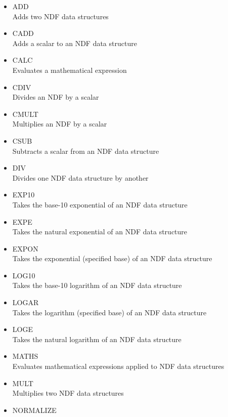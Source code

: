 \documentclass[twoside,11pt]{article}
\newcommand{\xref}[3]{#1}
\begin{document}
\begin{itemize}

\item{\xref{ADD}{sun95}{ADD}}\\
Adds two NDF data structures 
\item{\xref{CADD}{sun95}{CADD}}\\
Adds a scalar to an NDF data structure 
\item{\xref{CALC}{sun95}{CALC}}\\
Evaluates a mathematical expression  
\item{\xref{CDIV}{sun95}{CDIV}}\\
Divides an NDF by a scalar 
\item{\xref{CMULT}{sun95}{CMULT}}\\
Multiplies an NDF by a scalar 
\item{\xref{CSUB}{sun95}{CSUB}}\\
Subtracts a scalar from an NDF data structure 
\item{\xref{DIV}{sun95}{DIV}}\\
Divides one NDF data structure by another 
\item{\xref{EXP10}{sun95}{EXP10}}\\
Takes the base-10 exponential of an NDF data structure 
\item{\xref{EXPE}{sun95}{EXPE}}\\
Takes the natural exponential of an NDF data structure 
\item{\xref{EXPON}{sun95}{EXPON}}\\ 
Takes the exponential (specified base) of an NDF data structure 
\item{\xref{LOG10}{sun95}{LOG10}}\\
Takes the base-10 logarithm of an NDF data structure 
\item{\xref{LOGAR}{sun95}{LOGAR}}\\
Takes the logarithm (specified base) of an NDF data structure 
\item{\xref{LOGE}{sun95}{LOGE}}\\
Takes the natural logarithm of an NDF data structure 
\item{\xref{MATHS}{sun95}{MATHS}}\\
Evaluates mathematical expressions applied to NDF data structures 
\item{\xref{MULT}{sun95}{MULT}}\\
Multiplies two NDF data structures 
\item{\xref{NORMALIZE}{sun95}{NORMALIZE}}\\

\end{itemize}
\end{document}
